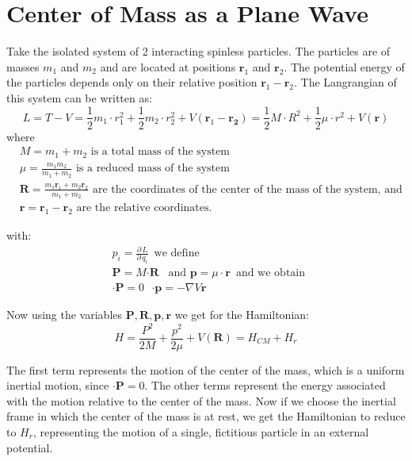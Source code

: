 \chapter{Center of Mass as a Plane Wave}
\label{AppendixA}

Take the isolated system of 2 interacting spinless particles. The particles are of masses $ m_1 $ and $ m_2 $ and are located at positions $ \mathbf{r}_1 $ and $ \mathbf{r}_2 $. The potential energy of the particles depends only on their relative position $ \mathbf{r}_1 - \mathbf{r}_2 $. The Langrangian of this system can be written as:
\begin{equation}
    L = T - V = \frac{1}{2}m_1\cdot{r}_1^2 + \frac{1}{2}m_2\cdot{r}_2^2 + V(\mathbf{r}_1 - \mathbf{r_2}) = \frac{1}{2}M\cdot{R}^2 + \frac{1}{2}\mu\cdot{r}^2 + V(\mathbf{r})
 \end{equation}
where
\begin{equation}
\begin{split}
& M = m_1 + m_2 \text{ is a total mass of the system}\\[.8em]
& \mu = \frac{m_1m_2}{m_1 + m_2} \text{ is a reduced mass of the system} \\[.8em]
& \mathbf{R} = \frac{m_1\mathbf{r}_1 + m_2\mathbf{r}_2}{m_1 + m_2} \text{ are the coordinates of the center of the mass of the system, and} \\[.8em]
& \mathbf{r} = \mathbf{r}_1 - \mathbf{r}_2 \text{ are the relative coordinates.}
\end{split}
\end{equation}

with:
\begin{equation}
\begin{split}
& p_i = \frac{\partial\,L}{\partial\,q_i}\,\text{ we define } \\[.8em]
& \mathbf{P} = M\mathbf{\cdot{R}}\,\,\,\text{  and  } \mathbf{p} = \mu\cdot\mathbf{r} \,\text{ and we obtain } \\[.8em]& \mathbf{\cdot{P}} = 0\,\,\,\,\mathbf{\cdot{p}} = -\nabla V{\mathbf{r}}
\end{split}
\end{equation}

Now using the variables $ \mathbf{P}, \mathbf{R}, \mathbf{p}, \mathbf{r} $ we get for the Hamiltonian:
\begin{equation}
H = \frac{P^2}{2M} + \frac{p^2}{2\mu} + V(\mathbf{R}) = H_{CM} + H_r
\end{equation}

The first term represents the motion of the center of the mass, which is a uniform inertial motion, since $ \mathbf{\cdot{P}} = 0 $. The other terms represent the energy associated with the motion relative to the center of the mass. Now if we choose the inertial frame in which the center of the mass is at rest, we get the Hamiltonian to reduce to $ H_r $, representing the motion of a single, fictitious particle in an external potential.


